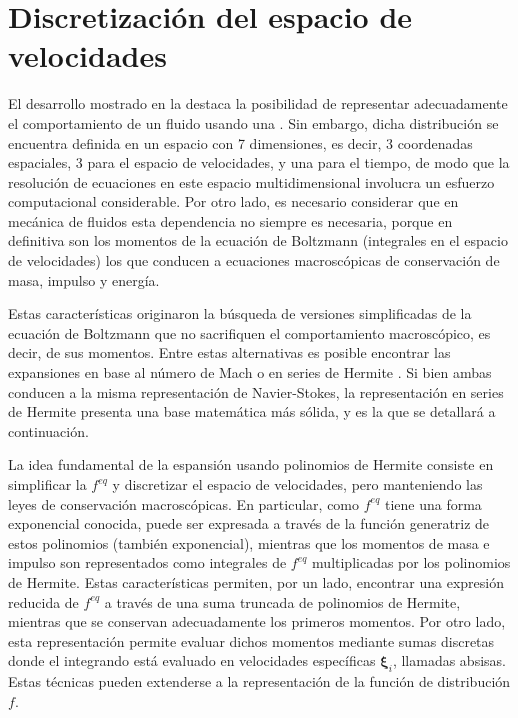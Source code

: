 \section{Discretizaci\'on del espacio de velocidades} 
El desarrollo mostrado en la  destaca la posibilidad de representar adecuadamente el comportamiento de un fluido usando una \fdp{} \fvar{}. Sin embargo, dicha distribuci\'on se encuentra definida en un espacio con 7 dimensiones, es decir, 3 coordenadas espaciales, 3 para el espacio de velocidades, y una para el tiempo, de modo que la resoluci\'on de ecuaciones en este espacio multidimensional involucra un esfuerzo computacional considerable. Por otro lado, es necesario considerar que en mec\'anica de fluidos esta dependencia no siempre es necesaria, porque en definitiva son los momentos de la ecuaci\'on de Boltzmann (integrales en el espacio de velocidades) los que conducen a ecuaciones macrosc\'opicas de conservaci\'on de masa, impulso y energ\'ia. 
\par 
Estas caracter\'isticas originaron la b\'usqueda de versiones simplificadas de la ecuaci\'on de Boltzmann que no sacrifiquen el comportamiento macrosc\'opico, es decir, de sus momentos. Entre estas alternativas es posible encontrar las expansiones en base al n\'umero de Mach \cite{he_lattice_1997} o en series de Hermite \cite{shan_kinetic_2006}. Si bien ambas conducen a la misma representaci\'on de Navier-Stokes, la representaci\'on en series de Hermite presenta una base matem\'atica m\'as s\'olida, y es la que se detallar\'a a continuaci\'on.
\par
La idea fundamental de la espansi\'on usando polinomios de Hermite consiste en simplificar la \edf{} $f^{eq}$ y discretizar el espacio de velocidades, pero manteniendo las leyes de conservaci\'on macrosc\'opicas. En particular, como $f^{eq}$ tiene una forma exponencial conocida, puede ser expresada a trav\'es de la funci\'on generatriz de estos polinomios (tambi\'en exponencial), mientras que los momentos de masa e impulso son representados como integrales de $f^{eq}$ multiplicadas por los polinomios de Hermite. Estas caracter\'isticas permiten, por un lado, encontrar una expresi\'on reducida de $f^{eq}$ a trav\'es de una suma truncada de polinomios de Hermite, mientras que se conservan adecuadamente los primeros momentos. Por otro lado, esta representaci\'on permite evaluar dichos momentos mediante sumas discretas donde el integrando est\'a evaluado en velocidades espec\'ificas $\bm{\xi}_i$, llamadas absisas. Estas t\'ecnicas pueden extenderse a la representaci\'on de la funci\'on de distribuci\'on $f$.


